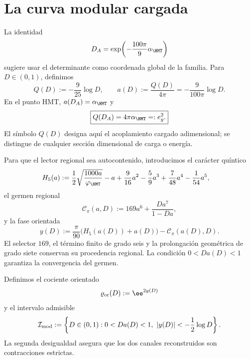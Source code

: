 \section{La curva modular cargada}

La identidad
\begin{equation}
 D_A=\exp\!\left(-\frac{100\pi}{9}\alpha_{\HMT}\right)
 \label{rm:eq:curve-D-alpha}
\end{equation}
sugiere usar el determinante como coordenada global de la familia. Para
\(D\in(0,1)\), definimos
\begin{equation}
 \boxed{
 Q(D):=-\frac9{25}\log D,}
 \qquad
 a(D):=\frac{Q(D)}{4\pi}
 =-\frac9{100\pi}\log D.
 \label{rm:eq:curve-Q-a}
\end{equation}
En el punto HMT, \(a(D_A)=\alpha_{\HMT}\) y
\begin{equation}
 \boxed{Q(D_A)=4\pi\alpha_{\HMT}=:e_g^2.}
 \label{rm:eq:curve-Q-gauge}
\end{equation}
El s\'imbolo \(Q(D)\) designa aqu\'i el acoplamiento cargado adimensional;
se distingue de cualquier secci\'on dimensional de carga o energ\'ia.

Para que el lector regional sea autocontenido, introducimos el car\'acter
qu\'intico
\begin{equation}
 \begin{aligned}
 H_5(a):={}&\frac12\sqrt{\frac{1000a}{\varphi_{\HMT}}}-a
 +\frac9{16}a^2-\frac59a^3
 +\frac7{48}a^4-\frac1{54}a^5,
 \end{aligned}
 \label{rm:eq:curve-H5}
\end{equation}
el germen regional
\begin{equation}
 \mathcal C_\pi(a,D)
 :=169a^6+\frac{Da^7}{1-Da},
 \label{rm:eq:curve-Cpi}
\end{equation}
y la fase orientada
\begin{equation}
 y(D):=\frac{\pi}{90}\bigl(H_5(a(D))+a(D)\bigr)
 -\mathcal C_\pi(a(D),D).
 \label{rm:eq:curve-yD}
\end{equation}
El selector \(169\), el t\'ermino finito de grado seis y la prolongaci\'on
geom\'etrica de grado siete conservan su procedencia regional. La condici\'on
\(0<Da(D)<1\) garantiza la convergencia del germen.

Definimos el cociente orientado
\begin{equation}
 \varrho_{\rm or}(D):=\ee^{2y(D)}
 \label{rm:eq:curve-rho-or}
\end{equation}
y el intervalo admisible
\begin{equation}
 \mathcal I_{\rm mod}:=
 \left\{D\in(0,1):
 0<Da(D)<1,
 \ |y(D)|<-\frac12\log D
 \right\}.
 \label{rm:eq:curve-domain}
\end{equation}
La segunda desigualdad asegura que los dos canales reconstruidos son
contracciones estrictas.

